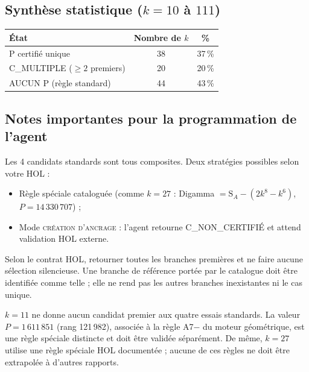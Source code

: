 \documentclass[11pt,a4paper]{article}
\newcommand{\SA}{\mathrm{S}_A}
\begin{document}
\subsection{Synthèse statistique ($k = 10$ à $111$)}

\begin{center}
\small
\begin{tabular}{@{}l c c@{}}
\toprule
\rowcolor{spectralgris}
État & Nombre de $k$ & \% \\
\midrule
P certifié unique & 38 & 37\,\% \\
C\_MULTIPLE ($\ge 2$ premiers) & 20 & 20\,\% \\
AUCUN P (règle standard) & 44 & 43\,\% \\
\bottomrule
\end{tabular}
\end{center}

\subsection{Notes importantes pour la programmation de l'agent}

\begin{boitealerte}
Les 4 candidats standards sont tous composites. Deux stratégies possibles selon
votre HOL :
\begin{itemize}[nosep]
  \item Règle spéciale cataloguée (comme $k=27$ : Digamma $= \SA - (2k^{8}-k^{6})$, $P = 14\,330\,707$) ;
  \item Mode \textsc{création d'ancrage} : l'agent retourne C\_NON\_CERTIFIÉ et attend validation HOL externe.
\end{itemize}
\end{boitealerte}

\begin{boitenote}
Selon le contrat HOL, retourner toutes les branches premières et ne faire
aucune sélection silencieuse. Une branche de référence portée par le catalogue
doit être identifiée comme telle ; elle ne rend pas les autres branches
inexistantes ni le cas unique.
\end{boitenote}

\begin{boitenote}
$k=11$ ne donne aucun candidat premier aux quatre essais standards. La valeur
$P=1\,611\,851$ (rang 121\,982), associée à la règle A7$-$ du moteur géométrique,
est une règle spéciale distincte et doit être validée séparément. De même,
$k=27$ utilise une règle spéciale HOL documentée ; aucune de ces règles ne doit
être extrapolée à d'autres rapports.
\end{boitenote}
\end{document}
